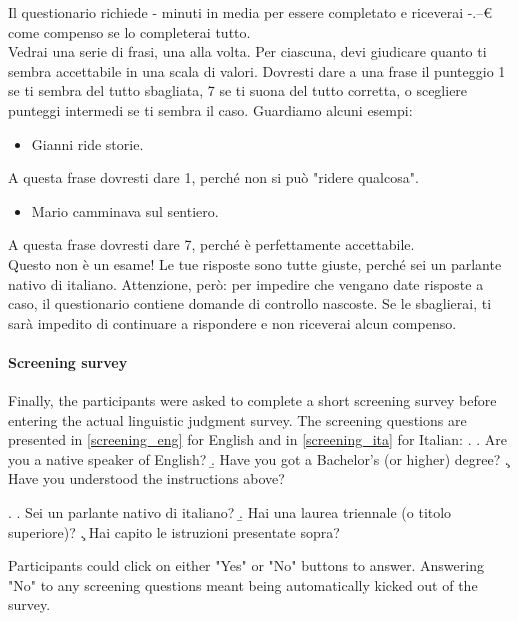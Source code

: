 \begin{kaobox}[frametitle=Instructions for the Italian survey]
Il questionario richiede - minuti in media per essere completato e riceverai -.--€ come compenso se lo completerai tutto.\\
Vedrai una serie di frasi, una alla volta. Per ciascuna, devi giudicare quanto ti sembra accettabile in una scala di valori. Dovresti dare a una frase il punteggio 1 se ti sembra del tutto sbagliata, 7 se ti suona del tutto corretta, o scegliere punteggi intermedi se ti sembra il caso. Guardiamo alcuni esempi:
\begin{itemize}
    \item Gianni ride storie.
\end{itemize}
A questa frase dovresti dare 1, perché non si può "ridere qualcosa".
\begin{itemize}
    \item Mario camminava sul sentiero.
\end{itemize}
A questa frase dovresti dare 7, perché è perfettamente accettabile.\\
Questo non è un esame! Le tue risposte sono tutte giuste, perché sei un parlante nativo di italiano. Attenzione, però: per impedire che vengano date risposte a caso, il questionario contiene domande di controllo nascoste. Se le sbaglierai, ti sarà impedito di continuare a rispondere e non riceverai alcun compenso.
\end{kaobox}

\paragraph{Screening survey} Finally, the participants were asked to complete a short screening survey before entering the actual linguistic judgment survey. The screening questions are presented in \ref{screening_eng} for English and in \ref{screening_ita} for Italian:
\ex. \label{screening_eng} \a. Are you a native speaker of English?
\b. Have you got a Bachelor's (or higher) degree?
\c. Have you understood the instructions above?

\ex. \label{screening_ita} \a. Sei un parlante nativo di italiano?
\b. Hai una laurea triennale (o titolo superiore)?
\c. Hai capito le istruzioni presentate sopra?

Participants could click on either "Yes" or "No" buttons to answer. Answering "No" to any screening questions meant being automatically kicked out of the survey.

